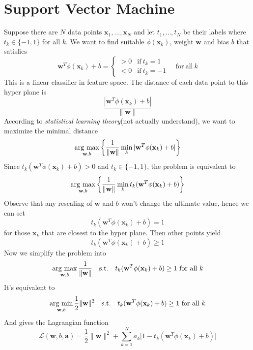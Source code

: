 \documentclass[../main.tex]{subfiles}
\begin{document}
    \section{Support Vector Machine}
        Suppose there are $N$ data points $\mathbf{x}_1,\dots,\mathbf{x}_N$ and let $t_1,\dots,t_N$ be their labels where $t_k\in\{-1,1\}$ for all $k$. We want to find suitable $\phi(\mathbf{x}_k)$, weight $\mathbf{w}$ and bias $b$ that satisfies
        \[
            \mathbf{w}^T \phi(\mathbf{x}_k) + b 
                    = \left\{
                    \begin{array}{rl}
                        > 0 & \mathrm{if ~} t_k = 1\\[0.2cm]
                        < 0 & \mathrm{if ~} t_k = -1
                    \end{array}
                      \right. \quad \mathrm{for~all~}k
        \]
        This is a linear classifier in feature space. The distance of each data point to this hyper plane is
        \[
            \frac { |\mathbf{w}^T \phi(\mathbf{x}_k) + b| } {\|\mathbf{w}\|}
        \]
        According to \textit{statistical learning theory}(not actually understand), we want to maximize the minimal distance
        \[
            \operatorname*{arg~max}_{\mathbf{w}, b}\left\{\frac{1}{\|\mathbf{w}\|} \min_{k} |\mathbf{w}^T \phi(\mathbf{x}_k) + b|\right\}
        \]
        Since $t_k(\mathbf{w}^T \phi(\mathbf{x}_k) + b) > 0$ and $t_k\in\{-1,1\}$, the problem is equivalent to
        \[
            \operatorname*{arg~max}_{\mathbf{w},b}\left\{\frac{1}{\|\mathbf{w}\|}\min_k t_k(\mathbf{w}^T \phi(\mathbf{x}_k) + b)\right\}
        \]
        Observe that any rescaling of $\mathbf{w}$ and $b$ won't change the ultimate value, hence we can set
        \[
            t_k (\mathbf{w}^T \phi(\mathbf{x}_k) + b) = 1
        \]
        for those $\mathbf{x}_k$ that are closest to the hyper plane. Then other points yield
        \[
            t_k (\mathbf{w}^T \phi(\mathbf{x}_k) + b) \geq 1
        \]
        Now we simplify the problem into
        \[
            \operatorname*{arg~max}_{\mathbf{w},b}\frac{1}{ \|\mathbf{w}\| } \mathrm{\quad s.t. \quad} t_k (\mathbf{w}^T \phi(\mathbf{x}_k) + b) \geq 1 \mathrm{~for~all~}k
        \]
        It's equivalent to
        \[
            \operatorname*{arg~min}_{\mathbf{w}, b}\frac{1}{2} \|\mathbf{w}\|^2 \mathrm{\quad s.t. \quad} t_k(\mathbf{w}^T \phi(\mathbf{x}_k) + b)\geq 1\mathrm{~for~all~}k
        \]
        And gives the Lagrangian function
        \[
            \mathcal{L}(\mathbf{w}, b, \mathbf{a}) = \frac{1}{2} \|\mathbf{w}\|^2 + \sum_{k=1}^N a_k \big[1 - t_k (\mathbf{w}^T \phi(\mathbf{x}_k) + b)\big]
        \]
\end{document}
